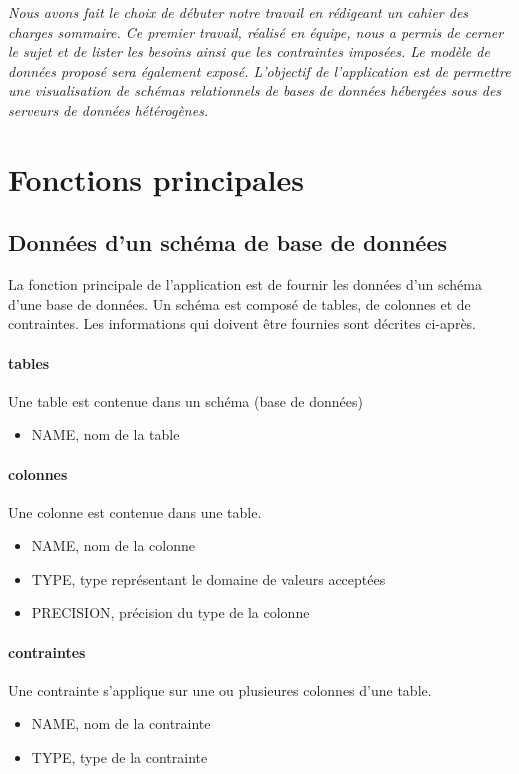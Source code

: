 \textit{Nous avons fait le choix de débuter notre travail en rédigeant un cahier des charges sommaire. Ce premier travail, réalisé en équipe, nous a permis de cerner le sujet et de lister les besoins ainsi que les contraintes imposées. Le modèle de données proposé sera également exposé. L’objectif de l'application est de permettre une visualisation de schémas relationnels de bases de données hébergées sous des serveurs de données hétérogènes.}


\section{Fonctions principales}
		\subsection{Données d'un schéma de base de données}
		La fonction principale de l'application est de fournir les données d'un schéma d'une base de données. Un schéma est composé de tables, de colonnes et de contraintes. Les informations qui doivent être fournies sont décrites ci-après.
		
			\paragraph{tables}
			Une table est contenue dans un schéma (base de données)
				\begin{itemize}
					\item NAME, nom de la table
				\end{itemize}
				
			\paragraph{colonnes}
			Une colonne est contenue dans une table.
				\begin{itemize}
					\item NAME, nom de la colonne
					\item TYPE, type représentant le domaine de valeurs acceptées
					\item PRECISION, précision du type de la colonne
				\end{itemize}
				
			\paragraph{contraintes}
			Une contrainte s'applique sur une ou plusieures colonnes d'une table.
				\begin{itemize}
					\item NAME, nom de la contrainte
					\item TYPE, type de la contrainte
				\end{itemize} 
				
